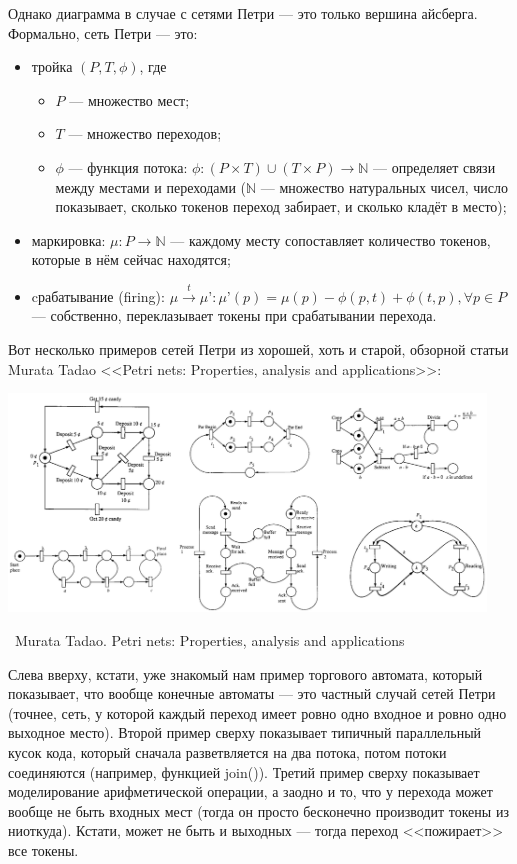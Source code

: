 \documentclass[a5paper]{article}
\newcommand{\attribution}[1] {
	\vspace{-5mm}\begin{flushright}\begin{scriptsize}%
	{\textcopyright\, #1}\end{scriptsize}\end{flushright}
}
\begin{document}
Однако диаграмма в случае с сетями Петри --- это только вершина айсберга. Формально, сеть Петри --- это:

\begin{itemize}
	\item тройка $(P, T, \phi)$, где
	\begin{itemize}
		\item $P$ --- множество мест;
		\item $T$ --- множество переходов;
		\item $\phi$ --- функция потока: $\phi : (P \times T) \cup (T \times P) \rightarrow \mathbb{N}$ --- определяет связи между местами и переходами ($\mathbb{N}$ --- множество натуральных чисел, число показывает, сколько токенов переход забирает, и сколько кладёт в место);
	\end{itemize}
	\item маркировка: $\mu : P \rightarrow \mathbb{N}$ --- каждому месту сопоставляет количество токенов, которые в нём сейчас находятся;
	\item cрабатывание (firing):
	$\mu \xrightarrow{t} \mu’ : \mu’(p) = \mu(p) - \phi(p, t) + \phi(t, p), \forall p \in P$ --- собственно, переклазывает токены при срабатывании перехода.
\end{itemize}

Вот несколько примеров сетей Петри из хорошей, хоть и старой, обзорной статьи Murata Tadao <<Petri nets: Properties, analysis and applications>>:

\begin{center}
	\includegraphics[width=0.95\textwidth]{petriNetExamples.png}
	\attribution{Murata Tadao. Petri nets: Properties, analysis and applications}
\end{center}

Слева вверху, кстати, уже знакомый нам пример торгового автомата, который показывает, что вообще конечные автоматы --- это частный случай сетей Петри (точнее, сеть, у которой каждый переход имеет ровно одно входное и ровно одно выходное место). Второй пример сверху показывает типичный параллельный кусок кода, который сначала разветвляется на два потока, потом потоки соединяются (например, функцией join()). Третий пример сверху показывает моделирование арифметической операции, а заодно и то, что у перехода может вообще не быть входных мест (тогда он просто бесконечно производит токены из ниоткуда). Кстати, может не быть и выходных --- тогда переход <<пожирает>> все токены.
\end{document}
